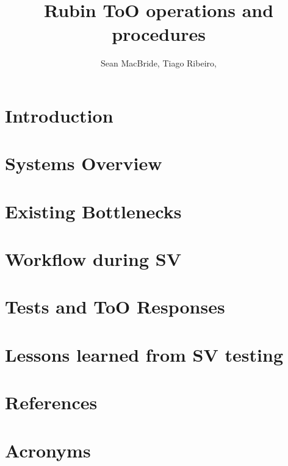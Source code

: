 \documentclass[OPS,lsstdraft,authoryear,toc]{lsstdoc}
\title{Rubin ToO operations and procedures}
\author{%
Sean MacBride,
Tiago Ribeiro,
}
\date{\vcsDate}
\begin{document}
\maketitle
\section{Introduction}\label{sec:introduction}

\newpage
\section{Systems Overview}\label{sec:sysOverview}

\newpage
\section{Existing Bottlenecks}\label{sec:existingBottlenecks}

\newpage
\section{Workflow during SV}\label{sec:workflow}

\newpage
\section{Tests and ToO Responses}\label{sec:ToOEvents}

\newpage
\section{Lessons learned from SV testing}\label{sec:LessonsLearned}


\appendix
\newpage
\section{References} \label{sec:bib}
\renewcommand{\refname}{} %


\newpage
\section{Acronyms} \label{sec:acronyms}

\end{document}
